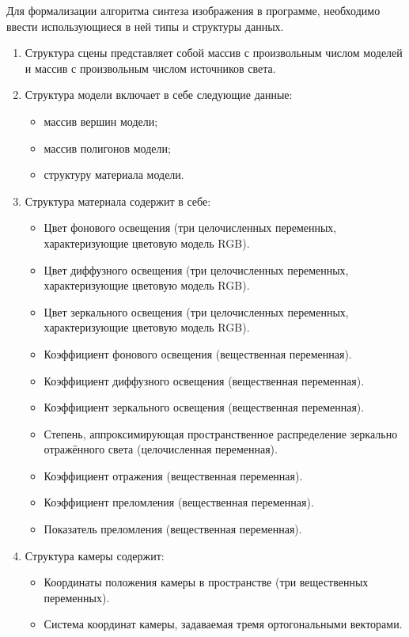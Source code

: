 Для формализации алгоритма синтеза изображения в программе, необходимо ввести использующиеся в ней типы и структуры данных.
\begin{enumerate}[label=\arabic*)]
	\item Структура сцены представляет собой массив с произвольным числом моделей и массив с произвольным числом источников света.
	\item Структура модели включает в себе следующие данные:
	\begin{itemize}[label=---]
		\item массив вершин модели;
		\item массив полигонов модели;
		\item структуру материала модели.
	\end{itemize}
	\item Структура материала содержит в себе:
	\begin{itemize}[label=---]
		\item Цвет фонового освещения (три целочисленных переменных, характеризующие цветовую модель RGB).
		\item Цвет диффузного освещения (три целочисленных переменных, характеризующие цветовую модель RGB).
		\item Цвет зеркального освещения (три целочисленных переменных, характеризующие цветовую модель RGB).
		\item Коэффициент фонового освещения (вещественная переменная).
		\item Коэффициент диффузного освещения (вещественная переменная).
		\item Коэффициент зеркального освещения (вещественная переменная).
		\item Степень, аппроксимирующая пространственное распределение зеркально отражённого света (целочисленная переменная).
		\item Коэффициент отражения (вещественная переменная).
		\item Коэффициент преломления (вещественная переменная).
		\item Показатель преломления (вещественная переменная).
	\end{itemize}
	\item Структура камеры содержит:
	\begin{itemize}[label=---]
		\item Координаты положения камеры в пространстве (три вещественных переменных).
		\item Система координат камеры, задаваемая тремя ортогональными векторами.

\end{itemize}
\end{enumerate}
